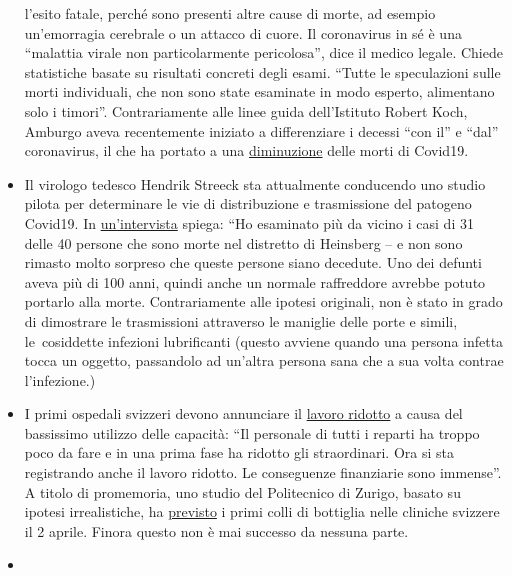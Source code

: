 \begin{itemize}
  l'esito fatale, perché sono presenti altre cause di morte, ad esempio
  un'emorragia cerebrale o un attacco di cuore. Il coronavirus in sé è
  una ``malattia virale non particolarmente pericolosa'', dice il medico
  legale. Chiede statistiche basate su risultati concreti degli esami.
  ``Tutte le speculazioni sulle morti individuali, che non sono state
  esaminate in modo esperto, alimentano solo i timori''. Contrariamente
  alle linee guida dell'Istituto Robert Koch, Amburgo aveva recentemente
  iniziato a differenziare i decessi ``con il'' e ``dal'' coronavirus,
  il che ha portato a una
  \href{https://www.t-online.de/nachrichten/deutschland/id_87636856/coronavirus-hamburg-will-nur-echte-covid-19-tote-zaehlen.html}{diminuzione}
  delle morti di Covid19.
\item
  Il virologo tedesco Hendrik Streeck sta attualmente conducendo uno
  studio pilota per determinare le vie di distribuzione e trasmissione
  del patogeno Covid19. In
  \href{https://www.zeit.de/wissen/gesundheit/2020-04/hendrik-streeck-covid-19-heinsberg-symptome-infektionsschutz-massnahmen-studie/komplettansicht}{un'intervista}
  spiega: ``Ho esaminato più da vicino i casi di 31 delle 40 persone che
  sono morte nel distretto di Heinsberg -- e non sono rimasto molto
  sorpreso che queste persone siano decedute. Uno dei defunti aveva più
  di 100 anni, quindi anche un normale raffreddore avrebbe potuto
  portarlo alla morte. Contrariamente alle ipotesi originali, non è
  stato in grado di dimostrare le trasmissioni attraverso le maniglie
  delle porte e simili, le~cosiddette infezioni lubrificanti (questo
  avviene quando una persona infetta tocca un oggetto, passandolo ad
  un'altra persona sana che a sua volta contrae l'infezione.)
\item
  I primi ospedali svizzeri devono annunciare il
  \href{https://www.engadinerpost.ch/2020/4/04/Engadiner-Spitaeler-haben-freie-Kapazitaeten}{lavoro
  ridotto} a causa del bassissimo utilizzo delle capacità: ``Il
  personale di tutti i reparti ha troppo poco da fare e in una prima
  fase ha ridotto gli straordinari. Ora si sta registrando anche il
  lavoro ridotto. Le conseguenze finanziarie sono immense''. A titolo di
  promemoria, uno studio del Politecnico di Zurigo, basato su ipotesi
  irrealistiche, ha
  \href{https://www.toponline.ch/news/coronavirus/detail/news/studie-bestaetigt-engpass-bei-spitalbetten-steht-kurz-bevor-00131333/}{previsto}
  i primi colli di bottiglia nelle cliniche svizzere il 2 aprile. Finora
  questo non è mai successo da nessuna parte.
\item

\end{itemize}
